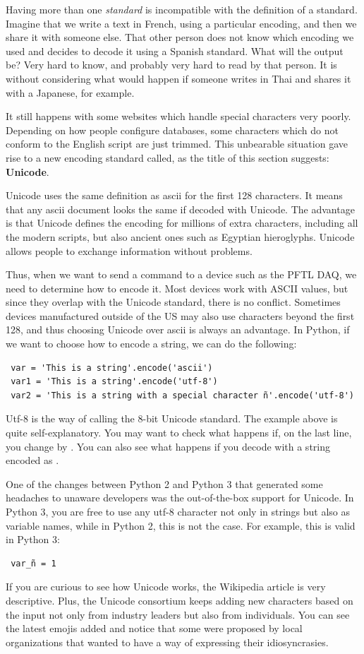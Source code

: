Having more than one \textit{standard} is incompatible with the definition of a standard. Imagine that we write a text in French, using a particular encoding, and then we share it with someone else. That other person does not know which encoding we used and decides to decode it using a Spanish standard. What will the output be? Very hard to know, and probably very hard to read by that person. It is without considering what would happen if someone writes in Thai and shares it with a Japanese, for example.

It still happens with some websites which handle special characters very poorly. Depending on how people configure databases, some characters which do not conform to the English script are just trimmed. This unbearable situation gave rise to a new encoding standard called, as the title of this section suggests: \textbf{Unicode}.

Unicode uses the same definition as ascii for the first 128 characters. It means that any ascii document looks the same if decoded with Unicode. The advantage is that Unicode defines the encoding for millions of extra characters, including all the modern scripts, but also ancient ones such as Egyptian hieroglyphs. Unicode allows people to exchange information without problems.

Thus, when we want to send a command to a device such as the {PFTL DAQ}, we need to determine how to encode it. Most devices work with ASCII values, but since they overlap with the Unicode standard, there is no conflict. Sometimes devices manufactured outside of the US may also use characters beyond the first 128, and thus choosing Unicode over ascii is always an advantage. In Python, if we want to choose how to encode a string, we can do the following:

\begin{verbatim}
 var = 'This is a string'.encode('ascii')
 var1 = 'This is a string'.encode('utf-8')
 var2 = 'This is a string with a special character ñ'.encode('utf-8')
\end{verbatim}

Utf-8 is the way of calling the 8-bit Unicode standard. The example above is quite self-explanatory. You may want to check what happens if, on the last line, you change  by . You can also see what happens if you decode with  a string encoded as .

One of the changes between Python 2 and Python 3 that generated some headaches to unaware developers was the out-of-the-box support for Unicode. In Python 3, you are free to use any utf-8 character not only in strings but also as variable names, while in Python 2, this is not the case. For example, this is valid in Python 3:

\begin{verbatim}
 var_ñ = 1
\end{verbatim}

If you are curious to see how Unicode works, the Wikipedia article is very descriptive. Plus, the Unicode consortium keeps adding new characters based on the input not only from industry leaders but also from individuals. You can see the latest emojis added and notice that some were proposed by local organizations that wanted to have a way of expressing their idiosyncrasies.
